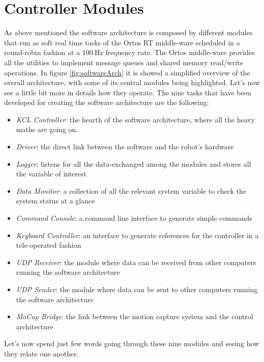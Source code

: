 \section{Controller Modules}
As above mentioned the software architecture is composed by different modules that run as soft real time tasks of the Ortos RT middle-ware scheduled in a round-robin fashion at a $\SI{100}{\hertz}$ frequency rate. The Ortos middle-ware provides all the utilities to implement message queues and shared memory read/write operations. In figure \ref{fig:softwareArch} it is showed a simplified overview of the overall architecture, with some of its central modules being highlighted. Let's now see a little bit more in details how they operate. The nine tasks that have been developed for creating the software architecture are the following:

\begin{itemize}[label=\termItemize]%
	\item \emph{KCL Controller}: the hearth of the software architecture, where all the heavy maths are going on.
	\item \emph{Driver}: the direct link between the software and the robot's hardware
	\item \emph{Logger}: listens for all the data-exchanged among the modules and stores all the variable of interest
	\item \emph{Data Monitor}: a collection of all the relevant system variable to check the system status at a glance
	\item \emph{Command Console}: a command line interface to generate simple commands
	\item \emph{Keyboard Controller}: an interface to generate references for the controller in a tele-operated fashion
	\item \emph{UDP Receiver}: the module where data can be received from other computers running the software architecture 
	\item \emph{UDP Sender}: the module where data can be sent to other computers running the software architecture 
	\item \emph{MoCap Bridge}: the link between the motion capture system and the control architecture
\end{itemize}

Let's now spend just few words going through these nine modules and seeing how they relate one another.


